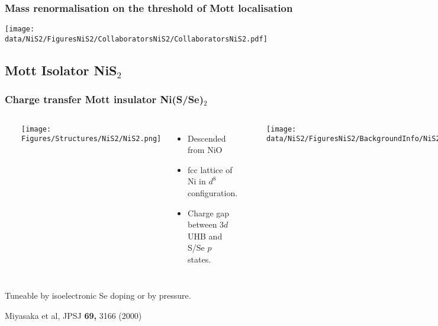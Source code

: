 


\begin{frame}[plain,label=Conc2]
\frametitle {Mass renormalisation on the threshold of Mott localisation}
\texttt{[image: \\data/NiS2/FiguresNiS2/CollaboratorsNiS2/CollaboratorsNiS2.pdf]}
\end{frame}

\subsection{Mott Isolator NiS$_2$}
\begin{frame}[label=NiS2-1]
\frametitle{Charge transfer Mott insulator Ni(S/Se)$_2$}
\begin{columns}[t]
\centerline{~}
\centerline{\texttt{[image: \\Figures/Structures/NiS2/NiS2.png]}}

\begin{itemize}

\item
Descended from NiO
\item
fcc lattice of Ni in $d^8$ configuration.
\item
Charge gap between $3d$ UHB and S/Se $p$ states. 

\end{itemize}
\centerline{~}
\centerline{\texttt{[image: \\data/NiS2/FiguresNiS2/BackgroundInfo/NiS2MiyasakaAnn]}}
\end{columns}
\vspace{0.5em}
\centerline{Tuneable by isoelectronic Se doping or by pressure.}
\vspace*{\fill}
\vspace{-0.25em}
\centerline{\makebox[\linewidth]{\rule{0.85\textwidth}{0.4pt}}}
\centerline{\scriptsize Miyasaka et al, JPSJ {\bf 69,} 3166 (2000)}
\end{frame}





